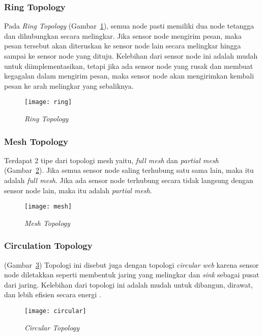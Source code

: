 \subsubsection{Ring Topology}
Pada {\it Ring Topology} (Gambar~\ref{fig:ring}), semua node pasti memiliki dua node tetangga dan dihubungkan secara melingkar. Jika sensor node mengirim pesan,  maka pesan tersebut akan diteruskan ke sensor node lain secara melingkar hingga sampai ke sensor node yang dituju. Kelebihan dari sensor node ini adalah mudah untuk diimplementasikan, tetapi jika ada sensor node yang rusak dan membuat kegagalan dalam mengirim pesan, maka sensor node akan mengirimkan kembali pesan ke arah melingkar yang sebaliknya.
\begin{figure} [H]
	\centering  
	\texttt{[image: ring]}  
	\caption[{\it Ring Topology}]{{\it Ring Topology}} 
	\label{fig:ring} 
\end{figure} 

\subsubsection{Mesh Topology}
Terdapat 2 tipe dari topologi mesh yaitu, {\it full mesh} dan {\it partial mesh} (Gambar~\ref{fig:mesh}). Jika semua sensor node saling terhubung satu sama lain, maka itu adalah {\it full mesh}. Jika ada sensor node terhubung secara tidak langsung dengan sensor node lain, maka itu adalah {\it partial mesh}.
\begin{figure} [H]
	\centering  
	\texttt{[image: mesh]}  
	\caption[{\it Mesh Topology}]{{\it Mesh Topology}} 
	\label{fig:mesh} 
\end{figure} 

\subsubsection{Circulation Topology}
(Gambar~\ref{fig:circular}) Topologi ini disebut juga dengan topologi {\it circular web} karena sensor node diletakkan seperti membentuk jaring yang melingkar dan {\it sink} sebagai pusat dari jaring. Kelebihan dari topologi ini adalah mudah untuk dibangun, dirawat, dan lebih efisien secara energi \cite{topologi:0:topologiWSN}.
\begin{figure} [H]
	\centering  
	\texttt{[image: circular]}  
	\caption[{\it Circular Topology}]{{\it Circular Topology}} 
	\label{fig:circular} 
\end{figure} 

